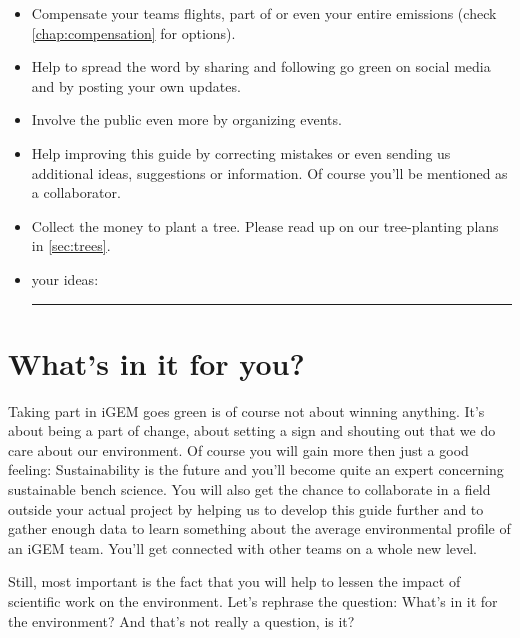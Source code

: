 {\begin{checklistbox}
\begin{itemize}
	\item Compensate your teams flights, part of or even your entire emissions (check \cref{chap:compensation} for options).
	\item Help to spread the word by sharing and following go green on social media and by posting your own updates.
	\item Involve the public even more by organizing events.
	\item Help improving this guide by correcting mistakes or even sending us additional ideas, suggestions or information. Of course you'll be mentioned as a collaborator.
	\item Collect the money to plant a tree. Please read up on our tree-planting plans in \cref{sec:trees}.
	\item your ideas: {\leavevmode\leaders\hrule  height -1.9pt depth 2pt \hfill\kern0pt\relax}
\end{itemize}
\end{checklistbox}
}

\section{What's in it for you?}

Taking part in iGEM goes green is of course not about winning anything. It's about being a part of change, about setting a sign and shouting out that we do care about our environment. Of course you will gain more then just a good feeling: Sustainability is the future and you'll become quite an expert concerning sustainable bench science. You will also get the chance to collaborate in a field outside your actual project by helping us to develop this guide further and to gather enough data to learn something about the average environmental profile of an iGEM team. You'll get connected with other teams on a whole new level.

Still, most important is the fact that you will help to lessen the impact of scientific work on the environment. Let's rephrase the question: What's in it for the environment? And that's not really a question, is it?
